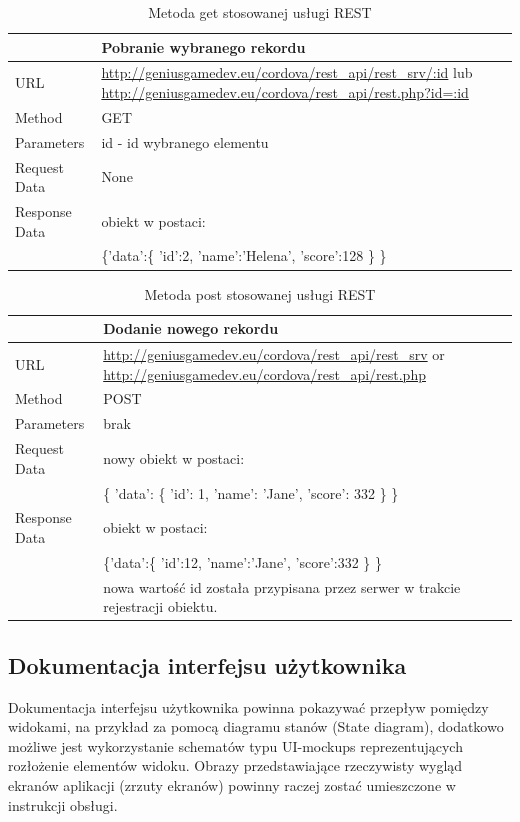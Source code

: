 \documentclass[12pt,a4paper]{article}
\begin{document}
\begin{table}[th]
\begin{tabularx}{\textwidth}{|l|X|}
\hline
&\textbf{Pobranie wybranego rekordu}\\\hline
URL &   \url{http://geniusgamedev.eu/cordova/rest_api/rest_srv/:id} lub \url{http://geniusgamedev.eu/cordova/rest_api/rest.php?id=:id}\\\hline
Method  & GET\\\hline
Parameters  & id - id wybranego elementu \\\hline
Request Data & None\\\hline
Response Data & obiekt w postaci:\\
&

\{'data':\{
    'id':2,
    'name':'Helena',
    'score':128
    \}
\}

\\\hline
\end{tabularx}
\caption{Metoda get stosowanej usługi REST}\label{rest1}
\end{table}

\begin{table}
\begin{tabularx}{\textwidth}{|l|X|}
\hline
&\textbf{Dodanie nowego rekordu}\\\hline
URL &   \url{http://geniusgamedev.eu/cordova/rest_api/rest_srv} or \url{http://geniusgamedev.eu/cordova/rest_api/rest.php}\\\hline
Method  & POST\\\hline
Parameters  & brak \\\hline
Request Data & nowy obiekt w postaci:\\
&\{
'data': \{
'id': 1,
'name': 'Jane',
'score': 332
\}
\}
\\\hline
Response Data & obiekt w postaci:\\
&
\{'data':\{
    'id':12,
    'name':'Jane',
    'score':332
    \}
\}
\\
&nowa wartość id została przypisana przez serwer w trakcie rejestracji obiektu.
\\\hline
\end{tabularx}
\caption{Metoda post stosowanej usługi REST}\label{rest2}
\end{table}



\subsection{Dokumentacja interfejsu użytkownika}
Dokumentacja interfejsu użytkownika powinna pokazywać przepływ pomiędzy widokami, na przykład za pomocą diagramu stanów (State diagram), dodatkowo możliwe jest wykorzystanie schematów typu UI-mockups reprezentujących rozłożenie elementów widoku. Obrazy przedstawiające rzeczywisty wygląd ekranów aplikacji (zrzuty ekranów) powinny raczej zostać umieszczone w instrukcji obsługi.
\end{document}
